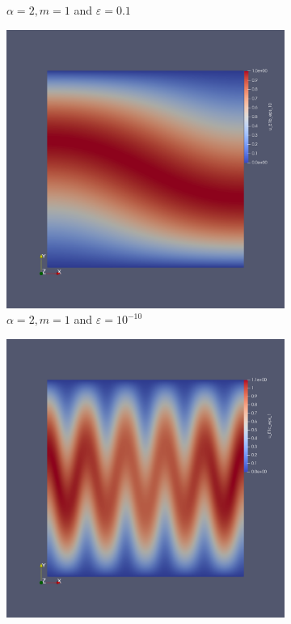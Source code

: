 \documentclass[12pt,a4paper]{article}
\begin{document}
\begin{figure}[H]
\begin{subfigure}{0.44\textwidth}
     \caption{$\alpha=2, m=1$ and $\varepsilon = 0.1$}
 \end{subfigure}
 \begin{subfigure}{0.44\textwidth}
     \includegraphics[width=\textwidth]{Pics/uf/U_E1b_eps_10.png}
     \caption{$\alpha=2, m=1$ and $\varepsilon = 10^{-10}$}
 \end{subfigure}
 \begin{subfigure}{0.44\textwidth}
     \includegraphics[width=\textwidth]{Pics/uf/U_E1c_eps_1.png}

\end{subfigure}
\end{figure}
\end{document}
